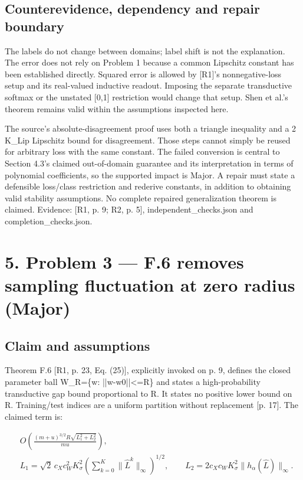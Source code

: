 \documentclass[10pt]{article}
\begin{document}
\subsection*{Counterevidence, dependency and repair boundary}
The labels do not change between domains; label shift is not the explanation. The error does not rely on Problem 1 because a common Lipschitz constant has been established directly. Squared error is allowed by [R1]’s nonnegative-loss setup and its real-valued inductive readout. Imposing the separate transductive softmax or the unstated [0,1] restriction would change that setup. Shen et al.’s theorem remains valid within the assumptions inspected here.\par
The source’s absolute-disagreement proof uses both a triangle inequality and a 2 K\_Lip Lipschitz bound for disagreement. Those steps cannot simply be reused for arbitrary loss with the same constant. The failed conversion is central to Section 4.3’s claimed out-of-domain guarantee and its interpretation in terms of polynomial coefficients, so the supported impact is Major. A repair must state a defensible loss/class restriction and rederive constants, in addition to obtaining valid stability assumptions. No complete repaired generalization theorem is claimed. Evidence: [R1, p. 9; R2, p. 5], independent\_checks.json and completion\_checks.json.\par
\section*{5. Problem 3 — F.6 removes sampling fluctuation at zero radius (Major)}
\subsection*{Claim and assumptions}
Theorem F.6 [R1, p. 23, Eq. (25)], explicitly invoked on p. 9, defines the closed parameter ball W\_R=\{w: ||w-w0||<=R\} and states a high-probability transductive gap bound proportional to R. It states no positive lower bound on R. Training/test indices are a uniform partition without replacement [p. 17]. The claimed term is:\par
\[\begin{aligned}
& O\!\left(\frac{(m+u)^{3/2}R\sqrt{L_1^2+L_2^2}}{mu}\right),\\
& L_1=\sqrt2\,c_Xc_W^2K_\sigma^2\!\left(\sum_{k=0}^K\|\widehat L^k\|_\infty\right)^{1/2},
\qquad L_2=2c_Xc_WK_\sigma^2\|h_\alpha(\widehat L)\|_\infty .
\end{aligned}\]\par
\end{document}
